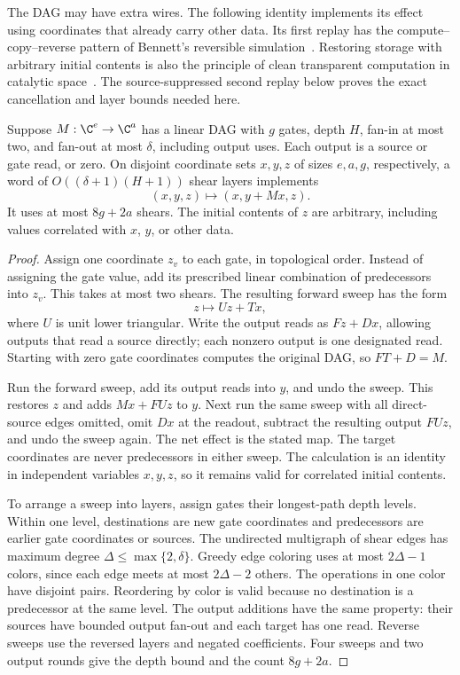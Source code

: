 The DAG may have extra wires. The following identity implements its
effect using coordinates that already carry other data. Its first replay
has the compute--copy--reverse pattern of Bennett's reversible
simulation~\cite{bennett1973}. Restoring storage with arbitrary initial
contents is also the principle of clean transparent computation in
catalytic space~\cite[Section~3]{buhrmanEtAl2014}. The source-suppressed second
replay below proves the exact cancellation and layer bounds needed here.

\begin{lemma}\label{loc:replay}
Suppose $M:\C^e\to\C^a$ has a linear DAG with $g$ gates, depth $H$,
fan-in at most two, and fan-out at most $\delta$, including output
uses.  Each output is a source or gate read, or zero.  On disjoint
coordinate sets $x,y,z$ of sizes $e,a,g$, respectively,
a word of $O((\delta+1)(H+1))$ shear layers implements
\[
 (x,y,z)\longmapsto(x,y+Mx,z).
\]
It uses at most $8g+2a$ shears.  The initial contents of $z$ are arbitrary,
including values correlated with $x$, $y$, or other data.
\end{lemma}

\begin{proof}
Assign one coordinate $z_v$ to each gate, in topological order.  Instead
of assigning the gate value, add its prescribed linear combination of
predecessors into $z_v$.  This takes at most two shears.  The resulting
forward sweep has the form
\[
 z\longmapsto Uz+Tx,
\]
where $U$ is unit lower triangular.  Write the output reads as $Fz+Dx$,
allowing outputs that read a source directly; each nonzero output is
one designated read.  Starting with zero gate coordinates computes the
original DAG, so $FT+D=M$.

Run the forward sweep, add its output reads into $y$, and undo the
sweep.  This restores $z$ and adds $Mx+FUz$ to $y$.  Next run the same
sweep with all direct-source edges omitted, omit $Dx$ at the readout,
subtract the resulting output $FUz$, and undo the sweep again.  The net
effect is the stated map.  The target coordinates are never
predecessors in either sweep.  The calculation is an identity in
independent variables $x,y,z$, so it remains valid for correlated
initial contents.

To arrange a sweep into layers, assign gates their longest-path depth
levels.  Within one level, destinations are new gate coordinates and
predecessors are earlier gate coordinates or sources.  The undirected
multigraph of shear edges has maximum degree
$\Delta\le\max\{2,\delta\}$.  Greedy edge coloring uses at most
$2\Delta-1$ colors, since each edge meets at most $2\Delta-2$ others.
The operations in one color have disjoint pairs.  Reordering by color
is valid because no destination is a predecessor at the same level.
The output additions have the same property: their sources have
bounded output fan-out and each target has one read.  Reverse sweeps
use the reversed layers and negated coefficients.  Four sweeps and
two output rounds give the depth bound and the count $8g+2a$.
\end{proof}

